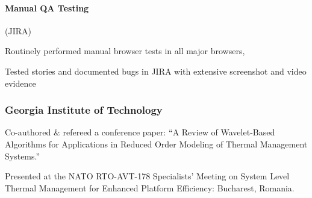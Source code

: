 \begin{position}
  \paragraph{Manual QA Testing} (JIRA)
  \begin{myitem}
  \item Routinely performed manual browser tests in all major browsers,
  \item Tested stories and documented bugs in JIRA with extensive screenshot and video evidence
  \end{myitem}
\end{position}

\subsubsection{Georgia Institute of Technology}
%
\begin{position}
  \begin{myitem}
  \item Co-authored \& refereed a conference paper: ``A Review of Wavelet-Based Algorithms for
    Applications in Reduced Order Modeling of Thermal Management Systems.''
  \item Presented at the NATO RTO-AVT-178 Specialists' Meeting on System Level Thermal Management for
    Enhanced Platform Efficiency: Bucharest, Romania.
  \end{myitem}
\end{position}

